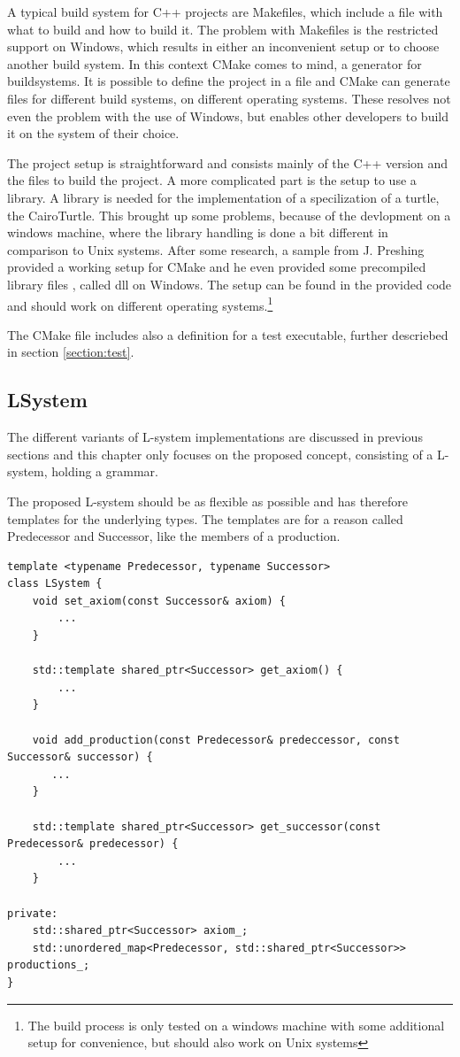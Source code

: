 \documentclass[english]{cpp-hmwk}
\begin{document}
A typical build system for C++ projects are Makefiles, which include a file with what to build and how to build it. The problem with Makefiles is the restricted support on Windows, which results in either an inconvenient setup or to choose another build system.
In this context CMake comes to mind, a generator for buildsystems. It is possible to define the project in a file and CMake can generate files for different build systems, on different operating systems. These resolves not even the problem with the use of Windows, but enables other developers to build it on the system of their choice.

The project setup is straightforward and consists mainly of the C++ version and the files to build the project. A more complicated part is the setup to use a library. A library is needed for the implementation of a specilization of a turtle, the CairoTurtle. This brought up some problems, because of the devlopment on a windows machine, where the library handling is done a bit different in comparison to Unix systems. After some research, a sample from J. Preshing \cite{cairoinclude} provided a working setup for CMake and he even provided some precompiled library files \cite{cairodll}, called dll on Windows. 
The setup can be found in the provided code and should work on different operating systems.\footnote{The build process is only tested on a windows machine with some additional setup for convenience, but should also work on Unix systems}

The CMake file includes also a definition for a test executable, further descriebed in section \ref{section:test}.

\subsection{LSystem}
\label{section:impl_l_system}
The different variants of L-system implementations are discussed in previous sections and this chapter only focuses on the proposed concept, consisting of a L-system, holding a grammar.

The proposed L-system should be as flexible as possible and has therefore templates for the underlying types. The templates are for a reason called Predecessor and Successor, like the members of a production.

\medskip
\begin{lstlisting}
template <typename Predecessor, typename Successor>
class LSystem {
    void set_axiom(const Successor& axiom) {
        ...
    }

    std::template shared_ptr<Successor> get_axiom() {
        ...
    }

    void add_production(const Predecessor& predeccessor, const Successor& successor) {
       ...
    }

    std::template shared_ptr<Successor> get_successor(const Predecessor& predecessor) {
        ...
    }
    
private:
    std::shared_ptr<Successor> axiom_;
    std::unordered_map<Predecessor, std::shared_ptr<Successor>> productions_;
}
\end{lstlisting}
\end{document}
